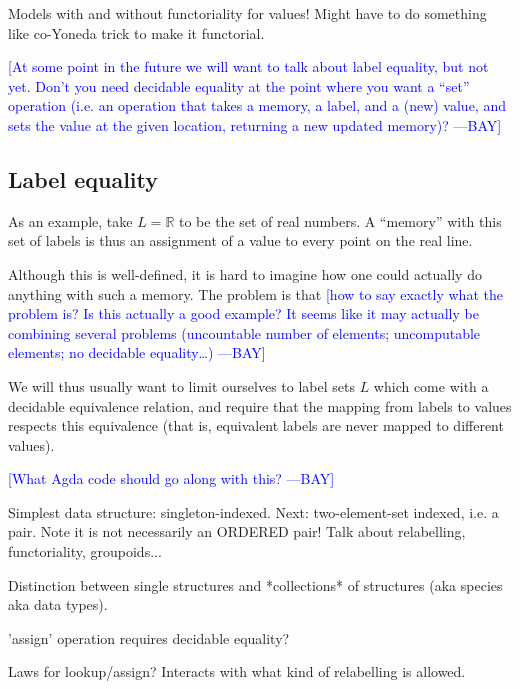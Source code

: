 \documentclass{jfp}
\newcommand{\authornote}[3]{\textcolor{#1}{[#3 ---#2]}}
\newcommand{\authornote}[3]{}
\newcommand{\bay}[1]{\authornote{blue}{BAY}{#1}}
\begin{document}
\begin{commentary}
  Models with and without functoriality for values!  Might have to do
  something like co-Yoneda trick to make it functorial.
\end{commentary}

\bay{At some point in the future we will want to talk about label
  equality, but not yet.  Don't you need decidable equality at the
  point where you want a ``set'' operation (i.e. an operation that
  takes a memory, a label, and a (new) value, and sets the value at
  the given location, returning a new updated memory)?}

\subsection{Label equality}
\label{sec:label-equality}

As an example, take $L = \mathbb{R}$ to be the set of real numbers.
A ``memory'' with this set of labels is thus an assignment of a value
to every point on the real line.

Although this is well-defined, it is hard to imagine how one could
actually do anything with such a memory.  The problem is that
\bay{how to say exactly what the problem is?  Is this actually a good
  example?  It seems like it may actually be combining several
  problems (uncountable number of elements; uncomputable elements; no
  decidable equality\dots)}

We will thus usually want to limit ourselves to label sets $L$ which
come with a decidable equivalence relation, and require that the
mapping from labels to values respects this equivalence (that is,
equivalent labels are never mapped to different values).

\bay{What Agda code should go along with this?}


\begin{commentary}
  Simplest data structure: singleton-indexed.  Next: two-element-set
  indexed, i.e. a pair.  Note it is not necessarily an ORDERED pair!
  Talk about relabelling, functoriality, groupoids...

  Distinction between single structures and *collections* of
  structures (aka species aka data types).

  'assign' operation requires decidable equality?

  Laws for lookup/assign?  Interacts with what kind of relabelling is
  allowed.
\end{commentary}
\end{document}
